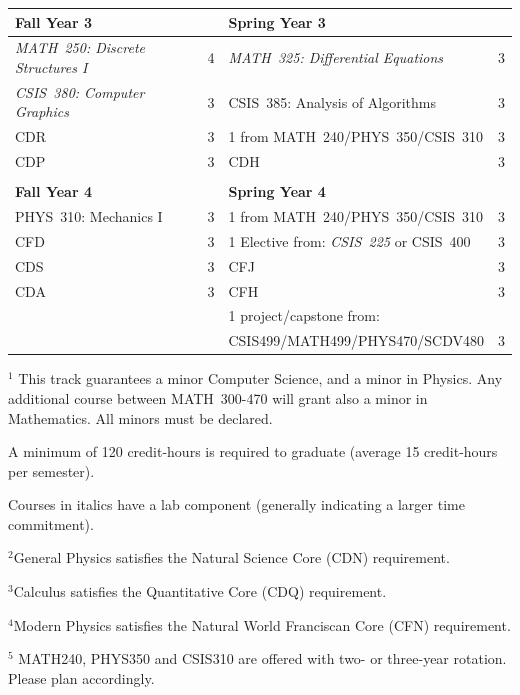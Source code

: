 \documentclass[12pt]{article}
\begin{document}
\begin{table}[h!]
\begin{center}
{\begin{tabular*}{0.9\textwidth}{@{\extracolsep{\fill}}lclc}
{\Large \textbf{Fall Year 3}} & & {\Large \textbf{Spring Year 3}} & \\
\hline
{\em MATH~250: Discrete Structures I}       & 4 & {\em MATH~325: Differential Equations} 			& 3  \\
{\em CSIS~380: Computer Graphics} 	            & 3 & CSIS~385: Analysis of Algorithms 	& 3 \\
CDR								& 3 &1 from MATH~240/PHYS~350/CSIS~310     				& 3 \\
CDP  									& 3 & CDH											&3  \\

 & \\
 
{\Large \textbf{Fall Year 4}} & & {\Large \textbf{Spring Year 4}} & \\
\hline
PHYS~310: Mechanics I & 3 & 1 from MATH~240/PHYS~350/CSIS~310 					& 3 \\
CFD					& 3 & 1 Elective from: {\em CSIS~225} or CSIS~400			& 3 \\
CDS  						& 3 & CFJ    			& 3 \\
CDA                    				& 3  & CFH              							& 3 \\
                        				&  &   1 project/capstone from:              							&  \\
      & & CSIS499/MATH499/PHYS470/SCDV480  &3\\
      
\hline
\end{tabular*}
}
\end{center}
\end{table}

\hspace{0.1in}$^{1}$ This track guarantees a minor  Computer Science, and a minor in Physics. Any additional course between MATH~300-470 will grant also a minor in Mathematics. All minors  must be declared.

\hspace*{0.1in} A minimum of 120 credit-hours is required to graduate (average 15 credit-hours per semester).

\hspace*{0.1in}Courses in italics have a lab
component (generally indicating a larger time commitment). 

\hspace{0.1in}$^{2}$General Physics satisfies the Natural Science Core (CDN) requirement.

\hspace{0.1in}$^{3}$Calculus satisfies the Quantitative Core (CDQ) requirement.

\hspace{0.1in}$^{4}$Modern Physics satisfies the Natural World Franciscan Core
(CFN) requirement.

\hspace{0.1in}$^{5}$ MATH240, PHYS350 and CSIS310 are offered with two- or three-year rotation. Please plan accordingly.
\newpage
\end{document}
